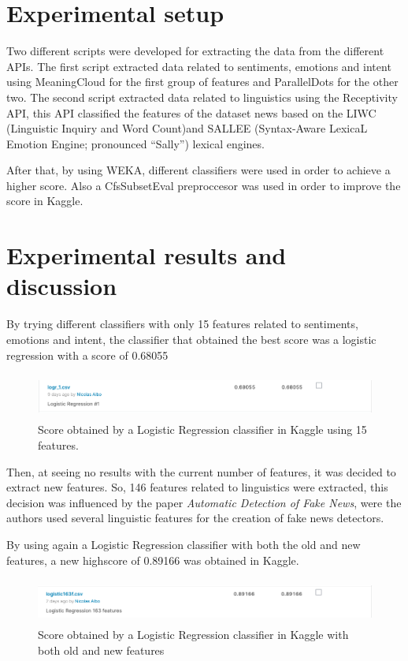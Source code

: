 \documentclass[runningheads]{llncs}
\begin{document}
\section{Experimental setup}
Two different scripts were developed for extracting the data from the different APIs. The first script extracted data related to sentiments, emotions and intent using MeaningCloud for the first group of features and ParallelDots for the other two. The second script extracted data related to linguistics using the Receptivity API, this API classified the features of the dataset news based on the LIWC (Linguistic Inquiry and Word Count)and SALLEE (Syntax-Aware LexicaL Emotion Engine; pronounced “Sally”) lexical engines. 

After that, by using WEKA, different classifiers were used in order to achieve a higher score. Also a CfsSubsetEval preproccesor was used in order to improve the score in Kaggle. 

\section{Experimental results and discussion}
By trying different classifiers with only 15 features related to sentiments, emotions and intent, the classifier that obtained the best score was a logistic regression with a score of 0.68055

\begin{figure}[hbt!]
\centering
\includegraphics[width=12cm, height=1.5cm]{logreg1.png}
\caption{Score obtained by a Logistic Regression classifier in Kaggle using 15 features.}
\end{figure}

Then, at seeing no results with the current number of features, it was decided to extract new features. So, 146 features related to linguistics were extracted, this decision was influenced by the paper \emph{Automatic Detection of Fake News}, were the authors used several linguistic features for the creation of fake news detectors. 

By using again a Logistic Regression classifier with both the old and new features, a new highscore of 0.89166 was obtained in Kaggle.

\begin{figure}[hbt!]
\centering
\includegraphics[width=12cm, height=1.5cm]{logreg2.png}
\caption{Score obtained by a Logistic Regression classifier in Kaggle with both old and new features}
\end{figure}
\end{document}
